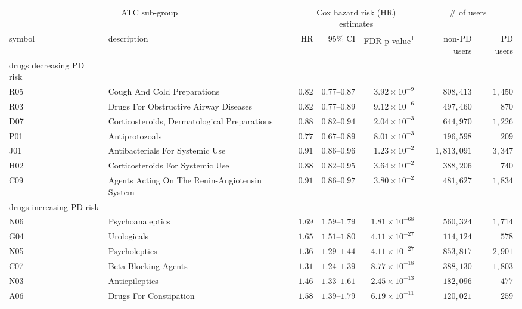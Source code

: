 \captionsetup[table]{labelformat=empty,skip=1pt}
\setlength{\LTpost}{0mm}
\begin{longtable}{llrrrrr}
\toprule
\multicolumn{2}{c}{ATC sub-group} & \multicolumn{3}{c}{Cox hazard risk (HR) estimates} & \multicolumn{2}{c}{\# of users} \\ 
\cmidrule(lr){1-2} \cmidrule(lr){3-5} \cmidrule(lr){6-7}
symbol & description & HR & 95\% CI & FDR p-value\textsuperscript{1} & non-PD users & PD users \\ 
\midrule
\multicolumn{1}{l}{drugs decreasing PD risk} \\ 
\midrule
R05 & Cough And Cold Preparations & $0.82$ & $0.77$–$0.87$ & $3.92 \times 10^{-9}$ & $808,413$ & $1,450$ \\ 
R03 & Drugs For Obstructive Airway Diseases & $0.82$ & $0.77$–$0.89$ & $9.12 \times 10^{-6}$ & $497,460$ & $870$ \\ 
D07 & Corticosteroids, Dermatological Preparations & $0.88$ & $0.82$–$0.94$ & $2.04 \times 10^{-3}$ & $644,970$ & $1,226$ \\ 
P01 & Antiprotozoals & $0.77$ & $0.67$–$0.89$ & $8.01 \times 10^{-3}$ & $196,598$ & $209$ \\ 
J01 & Antibacterials For Systemic Use & $0.91$ & $0.86$–$0.96$ & $1.23 \times 10^{-2}$ & $1,813,091$ & $3,347$ \\ 
H02 & Corticosteroids For Systemic Use & $0.88$ & $0.82$–$0.95$ & $3.64 \times 10^{-2}$ & $388,206$ & $740$ \\ 
C09 & Agents Acting On The Renin-Angiotensin System & $0.91$ & $0.86$–$0.97$ & $3.80 \times 10^{-2}$ & $481,627$ & $1,834$ \\ 
\midrule
\multicolumn{1}{l}{drugs increasing PD risk} \\ 
\midrule
N06 & Psychoanaleptics & $1.69$ & $1.59$–$1.79$ & $1.81 \times 10^{-68}$ & $560,324$ & $1,714$ \\ 
G04 & Urologicals & $1.65$ & $1.51$–$1.80$ & $4.11 \times 10^{-27}$ & $114,124$ & $578$ \\ 
N05 & Psycholeptics & $1.36$ & $1.29$–$1.44$ & $4.11 \times 10^{-27}$ & $853,817$ & $2,901$ \\ 
C07 & Beta Blocking Agents & $1.31$ & $1.24$–$1.39$ & $8.77 \times 10^{-18}$ & $388,130$ & $1,803$ \\ 
N03 & Antiepileptics & $1.46$ & $1.33$–$1.61$ & $2.45 \times 10^{-13}$ & $182,096$ & $477$ \\ 
A06 & Drugs For Constipation & $1.58$ & $1.39$–$1.79$ & $6.19 \times 10^{-11}$ & $120,021$ & $259$ \\ 

\end{longtable}
